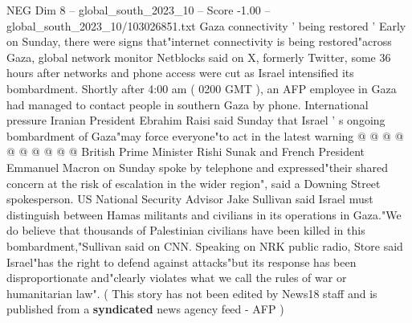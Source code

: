 \begin{textsample}{NEG Dim 8 – global\_south\_2023\_10 – Score -1.00 – global\_south\_2023\_10/103026851.txt}
Gaza connectivity ' being restored ' Early on Sunday, there were signs that"internet connectivity is being restored"across Gaza, global network monitor Netblocks said on X, formerly Twitter, some 36 hours after networks and phone access were cut as Israel intensified its bombardment.
Shortly after 4:00 am ( 0200 GMT ), an AFP employee in Gaza had managed to contact people in southern Gaza by phone.
International pressure Iranian President Ebrahim Raisi said Sunday that Israel ' s ongoing bombardment of Gaza"may force everyone"to act in the latest warning @ @ @ @ @ @ @ @ @ @ British Prime Minister Rishi Sunak and French President Emmanuel Macron on Sunday spoke by telephone and expressed"their shared concern at the risk of escalation in the wider region", said a Downing Street spokesperson.
US National Security Advisor Jake Sullivan said Israel must distinguish between Hamas militants and civilians in its operations in Gaza."We do believe that thousands of Palestinian civilians have been killed in this bombardment,"Sullivan said on CNN.
Speaking on NRK public radio, Store said Israel"has the right to defend against attacks"but its response has been disproportionate and"clearly violates what we call the rules of war or humanitarian law". ( This story has not been edited by News18 staff and is published from a \textbf{syndicated} news agency feed - AFP )

\end{textsample}
